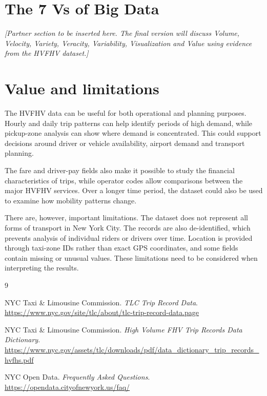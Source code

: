 \documentclass[10pt,twocolumn]{article}
\begin{document}
\section{The 7 Vs of Big Data}

\textit{[Partner section to be inserted here. The final version will
discuss Volume, Velocity, Variety, Veracity, Variability,
Visualization and Value using evidence from the HVFHV dataset.]}

\section{Value and limitations}

The HVFHV data can be useful for both operational and planning
purposes. Hourly and daily trip patterns can help identify periods
of high demand, while pickup-zone analysis can show where demand is
concentrated. This could support decisions around driver or vehicle
availability, airport demand and transport planning.

The fare and driver-pay fields also make it possible to study the
financial characteristics of trips, while operator codes allow
comparisons between the major HVFHV services. Over a longer time
period, the dataset could also be used to examine how mobility
patterns change.

There are, however, important limitations. The dataset does not
represent all forms of transport in New York City. The records are
also de-identified, which prevents analysis of individual riders or
drivers over time. Location is provided through taxi-zone IDs rather
than exact GPS coordinates, and some fields contain missing or
unusual values. These limitations need to be considered when
interpreting the results.

\begin{thebibliography}{9}
\small

NYC Taxi \& Limousine Commission.
\emph{TLC Trip Record Data}.
\url{https://www.nyc.gov/site/tlc/about/tlc-trip-record-data.page}

NYC Taxi \& Limousine Commission.
\emph{High Volume FHV Trip Records Data Dictionary}.
\url{https://www.nyc.gov/assets/tlc/downloads/pdf/data_dictionary_trip_records_hvfhs.pdf}

NYC Open Data.
\emph{Frequently Asked Questions}.
\url{https://opendata.cityofnewyork.us/faq/}

\end{thebibliography}
\end{document}

